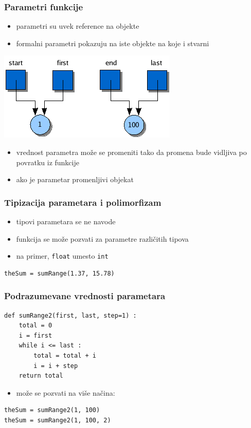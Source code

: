 \documentclass[compress]{beamer}
\begin{document}
\begin{frame}[fragile]
\frametitle{Parametri funkcije}
\begin{itemize}
  \item parametri su uvek reference na objekte
  \item formalni parametri pokazuju na iste objekte na koje i stvarni
\end{itemize}
\begin{center}
  \includegraphics[scale=0.7]{fnctalias.png}
\end{center}
\begin{itemize}
  \item vrednost parametra može se promeniti tako da promena bude vidljiva po 
    povratku iz funkcije
  \item ako je parametar promenljivi objekat
\end{itemize}
\end{frame}

\begin{frame}[fragile]
\frametitle{Tipizacija parametara i polimorfizam}
\begin{itemize}
  \item tipovi parametara se ne navode
  \item funkcija se može pozvati za parametre različitih tipova
  \item na primer, \texttt{float} umesto \texttt{int}
\end{itemize}
\begin{verbatim}
theSum = sumRange(1.37, 15.78)
\end{verbatim}
\end{frame}

\begin{frame}[fragile]
\frametitle{Podrazumevane vrednosti parametara}
\begin{verbatim}
def sumRange2(first, last, step=1) :
    total = 0
    i = first
    while i <= last :
        total = total + i
        i = i + step
    return total
\end{verbatim}
\begin{itemize}
  \item može se pozvati na više načina:
\end{itemize}
\begin{verbatim}
theSum = sumRange2(1, 100)
theSum = sumRange2(1, 100, 2)
\end{verbatim}
\end{frame}
\end{document}
